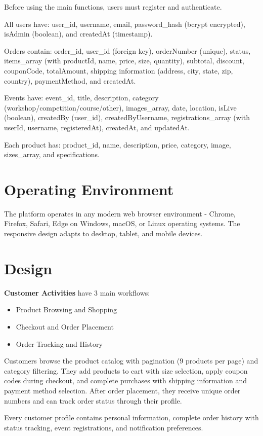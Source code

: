 \documentclass{scrreprt}
\begin{document}
Before using the main functions, users must register and authenticate.

All users have: user\_id, username, email, password\_hash (bcrypt encrypted), isAdmin (boolean), and createdAt (timestamp).

Orders contain: order\_id, user\_id (foreign key), orderNumber (unique), status, items\_array (with productId, name, price, size, quantity), subtotal, discount, couponCode, totalAmount, shipping information (address, city, state, zip, country), paymentMethod, and createdAt.

Events have: event\_id, title, description, category (workshop/competition/course/other), images\_array, date, location, isLive (boolean), createdBy (user\_id), createdByUsername, registrations\_array (with userId, username, registeredAt), createdAt, and updatedAt.

Each product has: product\_id, name, description, price, category, image, sizes\_array, and specifications.

\section{Operating Environment}
The platform operates in any modern web browser environment - Chrome, Firefox, Safari, Edge on Windows, macOS, or Linux operating systems. The responsive design adapts to desktop, tablet, and mobile devices.

\section{Design}

\textbf{Customer Activities} have 3 main workflows:
\begin{itemize}
\item Product Browsing and Shopping
\item Checkout and Order Placement
\item Order Tracking and History
\end{itemize}

Customers browse the product catalog with pagination (9 products per page) and category filtering. They add products to cart with size selection, apply coupon codes during checkout, and complete purchases with shipping information and payment method selection. After order placement, they receive unique order numbers and can track order status through their profile.

Every customer profile contains personal information, complete order history with status tracking, event registrations, and notification preferences.
\end{document}
